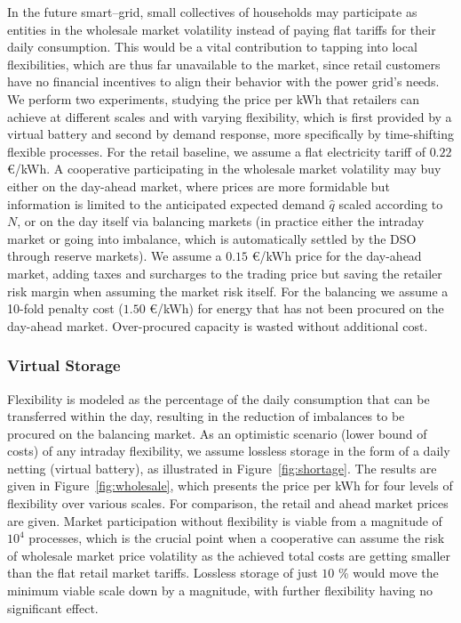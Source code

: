 \documentclass[conference]{IEEEtran}
\begin{document}
In the future smart--grid, small collectives of households may participate as entities in the wholesale market volatility instead of paying flat tariffs for their daily consumption. This would be a vital contribution to tapping into local flexibilities, which are thus far unavailable to the market, since retail customers have no financial incentives to align their behavior with the power grid's needs.
We perform two experiments, studying the price per kWh that retailers can achieve at different scales and with varying flexibility, which is first provided by a virtual battery and second by demand response, more specifically by time-shifting flexible processes. For the retail baseline, we assume a flat electricity tariff of $0.22$ \euro/kWh. A cooperative participating in the wholesale market volatility may buy either on the day-ahead market, where prices are more formidable but information is limited to the anticipated expected demand $\hat q$ scaled according to $N$, or on the day itself via balancing markets (in practice either the intraday market or going into imbalance, which is automatically settled by the DSO through reserve markets). We assume a $0.15$ \euro/kWh price for the day-ahead market, adding taxes and surcharges to the trading price but saving the retailer risk margin when assuming the market risk itself. For the balancing we assume a 10-fold penalty cost ($1.50$ \euro/kWh) for energy that has not been procured on the day-ahead market. Over-procured capacity is wasted without additional cost.

\subsubsection{Virtual Storage}
Flexibility is modeled as the percentage of the daily consumption that can be transferred within the day, resulting in the reduction of imbalances to be procured on the balancing market. As an optimistic scenario (lower bound of costs) of any intraday flexibility, we assume lossless storage in the form of a daily netting (virtual battery), as illustrated in Figure~\ref{fig:shortage}.
The results are given in Figure~\ref{fig:wholesale}, which presents the price per kWh for four levels of flexibility over various scales. For comparison, the retail and ahead market prices are given. Market participation without flexibility is viable from a magnitude of $10^4$ processes, which is the crucial point when a cooperative can assume the risk of wholesale market price volatility as the achieved total costs are getting smaller than the flat retail market tariffs. Lossless storage of just $10$ \% would move the minimum viable scale down by a magnitude, with further flexibility having no significant effect.
\end{document}
